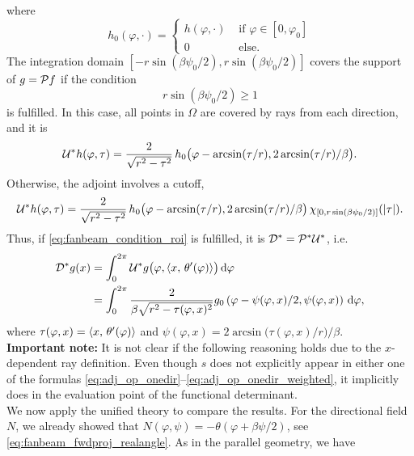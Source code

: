 \documentclass{amsart}
\renewcommand*{\phi}{\varphi}
\begin{document}
%
where
%
\begin{equation*}
 h_0(\phi, \cdot) =
 \begin{cases}
  h(\phi, \cdot) & \text{ if } \phi \in [0,\phi_0] \\
  0 & \text{ else}.
 \end{cases}
\end{equation*}
%
The integration domain $[-r\sin(\beta\psi_0/2), r\sin(\beta\psi_0/2)]$ covers the support of $g = {\mathcal{P}} f$ if the condition
%
\begin{equation}
 \label{eq:fanbeam_condition_roi}
 r \sin(\beta\psi_0/2) \geq 1
\end{equation}
%
is fulfilled. In this case, all points in $\Omega$ are covered by rays from each direction, and it is
%
\begin{equation}
 \label{eq:fanbeam_unit_trafo_adj_good}
 \DUALOPU h(\phi, \tau) = \frac{2}{\sqrt{r^2-\tau^2}} \, h_0\big(\phi - \arcsin(\tau/r), 2\arcsin(\tau/r)/\beta\big).
\end{equation}
%
Otherwise, the adjoint involves a cutoff,
%
\begin{equation}
 \label{eq:fanbeam_unit_trafo_adj_bad}
 \DUALOPU h(\phi, \tau) = \frac{2}{\sqrt{r^2-\tau^2}} \, h_0\big(\phi - \arcsin(\tau/r), 2\arcsin(\tau/r)/\beta\big)\, 
 \chi_{[0, r\sin(\beta\psi_0/2)]}(\ABS{\tau}).
\end{equation}
%
Thus, if \eqref{eq:fanbeam_condition_roi} is fulfilled, it is ${{\mathcal{D}}^*} = {{\mathcal{P}}^*}{{\mathcal{U}}^*}$, i.e.
%
\begin{align}
 \DUALOPD g(x)
 &= \int_0^{2\pi} \DUALOPU g\big(\phi, \INNER{x}{\theta'(\phi)}\big)\, \D\phi \notag\\
 \label{eq:fanbeam_backproj}
 &= \int_0^{2\pi} \frac{2}{\beta\sqrt{r^2-\tau(\phi, x)^2}} g_0\left(\phi - \psi(\phi,x)/2, \psi(\phi,x) \right)\, \D\phi,
\end{align}
%
where $\tau(\phi,x) = \INNER{x}{\theta'(\phi)}$ and $\psi(\phi,x) = 2\arcsin\big(\tau(\phi,x)/r\big) / \beta$.\\[1ex]
%
\textbf{Important note:} It is not clear if the following reasoning holds due to the $x$-dependent ray definition. Even though $s$ does 
not explicitly appear in either one of the formulas \eqref{eq:adj_op_onedir}--\eqref{eq:adj_op_onedir_weighted}, it implicitly does in the 
evaluation point of the functional determinant.\\[1ex]
%
We now apply the unified theory to compare the results. For the directional field $N$, we already showed that 
$N(\phi,\psi) = -\theta(\phi + \beta\psi/2)$, see \eqref{eq:fanbeam_fwdproj_realangle}. As in the parallel geometry, we have 
\end{document}
